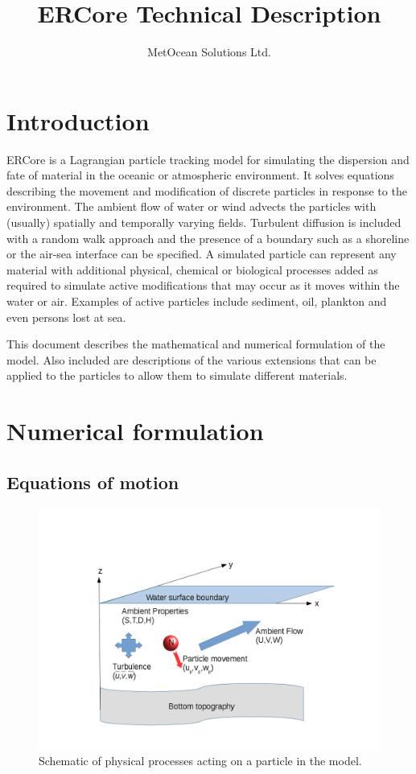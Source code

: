 \documentclass[a4paper]{article}
\title{ERCore Technical Description}
\author{MetOcean Solutions Ltd.}
\begin{document}
\maketitle

\section{Introduction}

ERCore is a Lagrangian particle tracking model for simulating the dispersion and fate of material in the oceanic or atmospheric environment.
It solves equations describing the movement and modification of discrete particles in response to the environment. The ambient flow of water or wind advects the particles with (usually) spatially and temporally varying fields.  
Turbulent diffusion is included with a random walk approach and the presence of a boundary such as a shoreline or the air-sea interface can be specified.
A simulated particle can represent any material with additional physical, chemical or biological processes added as required to simulate active modifications that may occur as it moves within the water or air.
Examples of active particles include sediment, oil, plankton and even persons lost at sea.

This document describes the mathematical and numerical formulation of the model.
Also included are descriptions of the various extensions that can be applied to the particles to allow them to simulate different materials.


\section{Numerical formulation}
\subsection{Equations of motion}
\begin{figure}
\includegraphics[width=\textwidth]{model.png}
\caption{Schematic of physical processes acting on a particle in the model.}
\end{figure}
\end{document}
